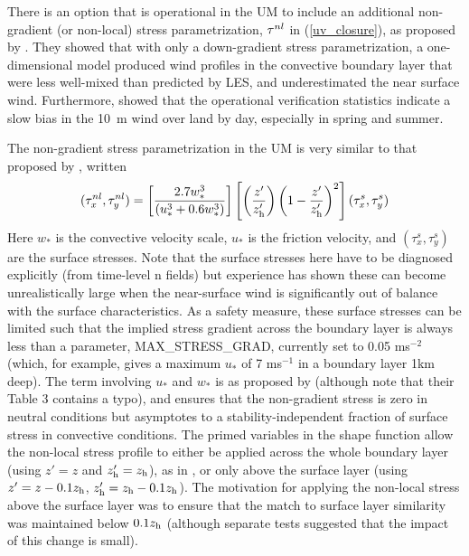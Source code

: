 \documentclass{UMDP_article}
\begin{document}
There is an option that is operational in the UM to include an
additional non-gradient (or non-local) stress parametrization, ${\bf
  \tau}^{nl}$ in (\ref{uv_closure}), as proposed by
\cite{brown97:_non}.  They showed that with only a down-gradient
stress parametrization, a one-dimensional model produced wind profiles
in the convective boundary layer that were less well-mixed than
predicted by LES, and underestimated the near surface wind.
Furthermore, \cite{brownetal2006} showed that the operational
verification statistics indicate a slow bias in the 10~m wind over
land by day, especially in spring and summer.

The non-gradient stress parametrization in the UM is very similar to
that proposed by \cite{brown97:_non}, written
\begin{equation}
  (\tau_x^{nl},\tau_y^{nl})= \left[
    \frac{2.7w_*^3}{(u_*^3+0.6w_*^3)}\right] \left[ \left( \frac{z'}{z_{\rm h}'}
    \right) \left( 1- \frac{z'}{z_{\rm h}'} \right)^2 \right]
  (\tau_x^{s},\tau_y^{s})
  \label{tau_nl}
\end{equation}
Here $w_*$ is the convective velocity scale, $u_*$ is the friction
velocity, and $(\tau_x^{s},\tau_y^{s})$ are the surface stresses.  
Note that the surface stresses here have to be diagnosed explicitly 
(from time-level n fields) but experience has shown these can become 
unrealistically large when the near-surface wind is significantly out 
of balance with the surface characteristics.  As a safety measure, 
these surface stresses can be limited such that the implied stress 
gradient across the boundary layer is always less than a parameter, 
MAX\_STRESS\_GRAD, currently set to 0.05 ms$^{-2}$ (which, for example, 
gives a maximum $u_*$ of 7 ms$^{-1}$ in a boundary layer 1km deep). The 
term involving $u_*$ and $w_*$ is as proposed by \cite{brown97:_non}
(although note that their Table 3 contains a typo), and ensures that
the non-gradient stress is zero in neutral conditions but asymptotes
to a stability-independent fraction of surface stress in convective
conditions.  The primed variables in the shape function allow the 
non-local stress profile to either be applied across the whole boundary 
layer (using $z'=z$ and $z_{\rm h}'=z_{\rm h}$), as in \cite{brown97:_non},
or only above the surface layer (using $z'=z-0.1z_{\rm h}$, $z_{\rm h}'=z_{\rm h}-0.1z_{\rm h}$).
The motivation for applying the non-local stress above the surface layer 
was to ensure that the match to surface layer similarity was maintained below
$0.1z_{\rm h}$ (although separate tests suggested that the impact of this
change is small).
\end{document}
